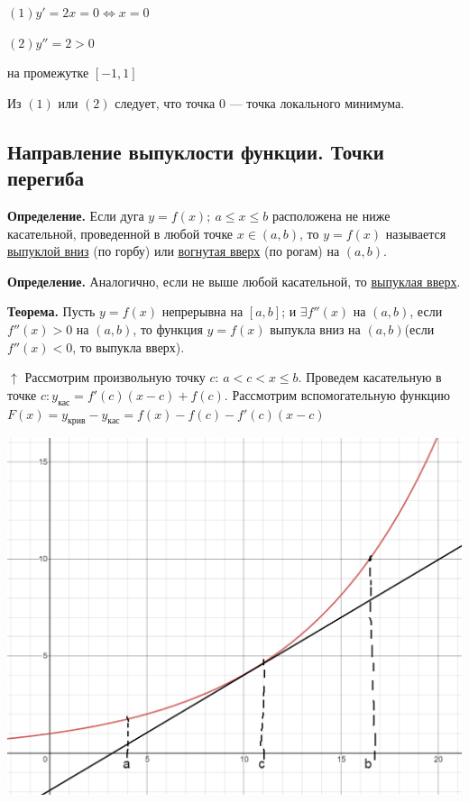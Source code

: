 \documentclass{article}
\begin{document}
\( (1) y' = 2x = 0 \Leftrightarrow x = 0 \)

\( (2) y'' = 2 > 0 \)

на промежутке \( [-1, 1] \)

Из $(1)$ или $(2)$ следует, что точка $0$ --- точка локального минимума.

\subsection{Направление выпуклости функции. Точки перегиба}

\textbf{Определение.} Если дуга \( y = f(x);\ a \leq x \leq b \) расположена не ниже касательной, проведенной в любой точке \(x \in (a, b)\), то \( y = f(x) \) называется \underline{выпуклой вниз} (по горбу) или \underline{вогнутая вверх} (по рогам) на \((a, b)\).

\textbf{Определение.} Аналогично, если не выше любой касательной, то \underline{выпуклая вверх}.

\textbf{Теорема.} Пусть \(y = f(x)\) непрерывна на \([a,b]\); и \(\exists f''(x)\) на \((a,b)\), если \(f''(x) > 0\) на \((a,b)\), то функция \(y = f(x)\) выпукла вниз на \((a,b)\)(если \(f''(x) < 0\), то выпукла вверх).

\(\uparrow\) Рассмотрим произвольную точку \( c \): \( a < c < x \leq b \). Проведем касательную в точке \( c: y_{\textrm{кас}} = f'(c)(x - c) + f(c) \). Рассмотрим вспомогательную функцию \( F(x) = y_{\textrm{крив}} - y_{\textrm{кас}} = f(x) - f(c) - f'(c)(x - c) \)

\includegraphics[scale=0.25]{11_1_11_2}
\end{document}
